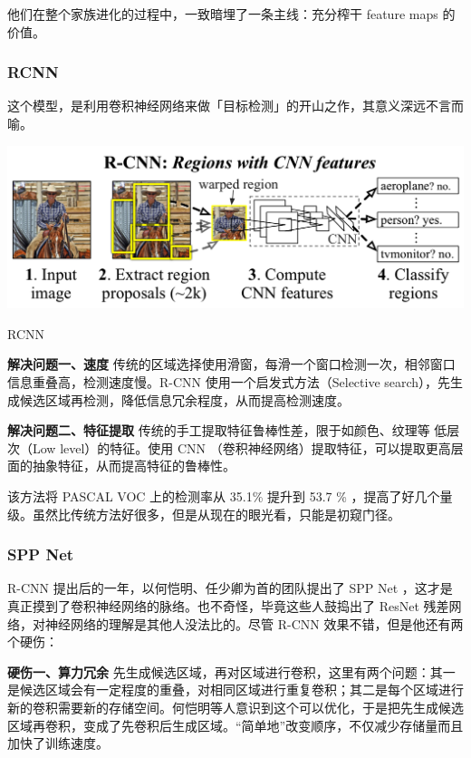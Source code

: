 他们在整个家族进化的过程中，一致暗埋了一条主线：充分榨干 feature maps 的价值。
\subsubsection{RCNN}
这个模型，是利用卷积神经网络来做「目标检测」的开山之作，其意义深远不言而喻。
\begin{uscfigure}
	\includegraphics[width=\textwidth]{./Pictures/rcnn-regions_with_cnn_features.png}	
	\caption{RCNN}
\end{uscfigure}

\textbf{解决问题一、速度}
传统的区域选择使用滑窗，每滑一个窗口检测一次，相邻窗口信息重叠高，检测速度慢。R-CNN 使用一个启发式方法（Selective search），先生成候选区域再检测，降低信息冗余程度，从而提高检测速度。

\textbf{解决问题二、特征提取}
传统的手工提取特征鲁棒性差，限于如颜色、纹理等 低层次（Low level）的特征。使用 CNN （卷积神经网络）提取特征，可以提取更高层面的抽象特征，从而提高特征的鲁棒性。

该方法将 PASCAL VOC 上的检测率从 35.1\% 提升到 53.7 \% ，提高了好几个量级。虽然比传统方法好很多，但是从现在的眼光看，只能是初窥门径。
\subsubsection{SPP Net}
R-CNN 提出后的一年，以何恺明、任少卿为首的团队提出了 SPP Net ，这才是真正摸到了卷积神经网络的脉络。也不奇怪，毕竟这些人鼓捣出了 ResNet 残差网络，对神经网络的理解是其他人没法比的。尽管 R-CNN 效果不错，但是他还有两个硬伤：

\textbf{硬伤一、算力冗余}
先生成候选区域，再对区域进行卷积，这里有两个问题：其一是候选区域会有一定程度的重叠，对相同区域进行重复卷积；其二是每个区域进行新的卷积需要新的存储空间。何恺明等人意识到这个可以优化，于是把先生成候选区域再卷积，变成了先卷积后生成区域。“简单地”改变顺序，不仅减少存储量而且加快了训练速度。

